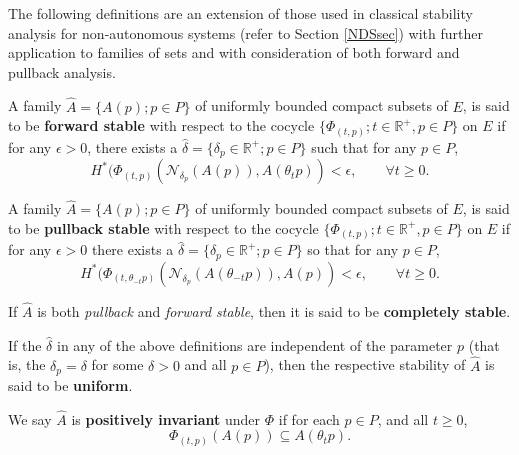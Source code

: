 The following definitions are an extension of those used in
classical stability analysis for non-autonomous systems (refer to
Section \ref{NDSsec}) with further application to families of sets
and with consideration of both forward and pullback analysis.

\begin{defn}\label{FSdef}
   A family $\hat{A} = \{A(p);p \in P\}$ of uniformly bounded compact
   subsets of $E$, is said to be {\bf forward stable} with respect to the
   cocycle $\{\Phi_{(t,p)}; t \in \mathbb{R}^{+},p \in P\}$ on $E$ if for
   any $\epsilon > 0$, there exists a $\hat{\delta} = \{\delta_p \in
   \mathbb{R}^+; p\in P\}$ such that for any $p \in P$,
   \begin{equation}\label{FSeq}
   H^*(\Phi_{(t,p)}(\mathcal{N}_{\delta_p}
            (A(p)),A(\theta_t p)) < \epsilon, \qquad \forall t \geq 0.
   \end{equation}
\end{defn}

\begin{defn}\label{PSdef}
   A family $\hat{A} = \{A(p);p \in P\}$ of uniformly bounded compact
   subsets of $E$, is said to be {\bf pullback stable} with respect to the
   cocycle $\{\Phi_{(t,p)}; t \in \mathbb{R}^{+},p \in P\}$ on $E$ if for
   any $\epsilon > 0$ there
   exists a $\hat{\delta} = \{\delta_p \in \mathbb{R}^+; p\in P\}$ so that
   for any $p \in P$,
   \begin{equation}\label{PSeq}
   H^*(\Phi_{(t,\theta_{-t}p)}(\mathcal{N}_{\delta_p}
            (A(\theta_{-t}p)),A(p)) < \epsilon, \qquad \forall t \geq 0.
   \end{equation}
\end{defn}

\begin{defn}\label{CSdef}
  If $\hat{A}$ is both {\em pullback} and {\em forward stable}, then it is
  said to be {\bf completely stable}.
\end{defn}

If the $\hat{\delta}$ in any of the above definitions are
independent of the parameter $p$ (that is, the
$\delta_p = \delta$ for some $\delta>0$ and all $p \in P$), then
the respective stability of $\hat{A}$ is said to be {\bf uniform}.

We say $\hat{A}$ is \textbf{positively invariant} under $\Phi$ if for each $p
\in P$, and all $t \geq 0$,
\[ \Phi_{(t,p)}(A(p)) \subseteq A(\theta_{t}p). \]

